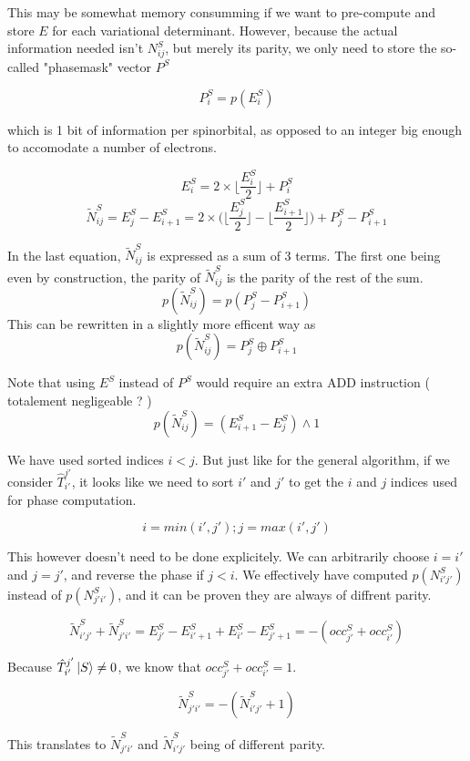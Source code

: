 This may be somewhat memory consumming if we want to pre-compute and store $E$ for each variational determinant. However, because the actual information needed isn't $N^S_{ij}$, but merely its parity, we only need to store the so-called "phasemask" vector $P^S$

$$P^S_i = p(E^S_i)$$

which is 1 bit of information per spinorbital, as opposed to an integer big enough to accomodate a number of electrons.
       
$$E^S_i = 2 \times  \lfloor \frac{E^S_i}2 \rfloor + P^S_i$$
$$\tilde N^S_{ij} = E^S_j - E^S_{i+1} = 2 \times \big ( \lfloor \frac{E^S_j}2 \rfloor - \lfloor \frac{E^S_{i+1}}2 \rfloor \big ) + P^S_j - P^S_{i+1}$$
	    
In the last equation, $\tilde N^S_{ij}$ is expressed as a sum of 3 terms. The first one being even by construction, the parity of $\tilde N^S_{ij}$ is the parity of the rest of the sum.
$$p(\tilde N^S_{ij})=p(P^S_j - P^S_{i+1})$$
This can be rewritten in a slightly more efficent way as
$$p(\tilde N^S_{ij}) = P^S_j \oplus P^S_{i+1}$$

Note that using $E^S$ instead of $P^S$ would require an extra ADD instruction ( totalement negligeable ? )
$$p(\tilde N^S_{ij}) = (E^S_{i+1} - E^S_j) \wedge 1$$

We have used sorted indices $i<j$. But just like for the general algorithm, if we consider $\hat T_{i'}^{j'}$, it looks like we need to sort $i'$ and $j'$ to get the $i$ and $j$ indices used for phase computation.

$$i=min(i', j') ; j=max(i', j')$$

This however doesn't need to be done explicitely. We can arbitrarily choose $i=i'$ and $j=j'$, and reverse the phase if $j<i$. We effectively have computed $p(N^S_{i'j'})$ instead of $p(N^S_{j'i'})$, and it can be proven they are always of diffrent parity.

$$\tilde N^{S}_{i' j'} + \tilde N^{S}_{j'i'} = E^{S}_{j'} - E^S_{i'+1} + E^S_{i'} - E^S_{j'+1} = -(occ^S_{j'} + occ^S_{i'})$$

Because $\hat T_{i'}^{j'} \ket S \neq 0$, we know that $occ^S_{j'} + occ^S_{i'} = 1$. 

$$\tilde N^{S}_{j' i'} = -(\tilde N^{S}_{i'j'} + 1)$$

This translates to $\tilde N^{S}_{j' i'}$ and $\tilde N^{S}_{i'j'}$ being of different parity.



